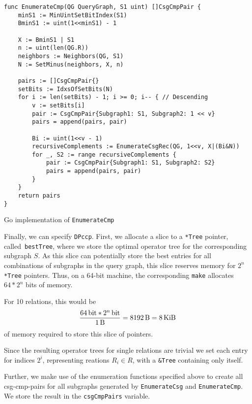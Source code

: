 \begin{algorithm}[H]
\begin{verbatim}
func EnumerateCmp(QG QueryGraph, S1 uint) []CsgCmpPair {
    minS1 := MinUintSetBitIndex(S1)
    BminS1 := uint(1<<minS1) - 1

    X := BminS1 | S1
    n := uint(len(QG.R))
    neighbors := Neighbors(QG, S1)
    N := SetMinus(neighbors, X, n)

    pairs := []CsgCmpPair{}
    setBits := IdxsOfSetBits(N)
    for i := len(setBits) - 1; i >= 0; i-- { // Descending
        v := setBits[i]
        pair := CsgCmpPair{Subgraph1: S1, Subgraph2: 1 << v}
        pairs = append(pairs, pair)

        Bi := uint(1<<v - 1)
        recursiveComplements := EnumerateCsgRec(QG, 1<<v, X|(Bi&N))
        for _, S2 := range recursiveComplements {
            pair := CsgCmpPair{Subgraph1: S1, Subgraph2: S2}
            pairs = append(pairs, pair)
        }
    }
    return pairs
}
\end{verbatim}
\caption{Go implementation of \texttt{EnumerateCmp}}
\label{alg:enumeratecmp}
\end{algorithm}
\newpage

Finally, we can specify \texttt{DPccp}. 
First, we allocate a slice to a \texttt{*Tree} pointer, called \texttt{bestTree}, where we store the optimal operator tree for the corresponding subgraph $S$. As this slice can potentially store the best entries for all combinations of subgraphs in the query graph, this slice reserves memory for $2^n$ \texttt{*Tree} pointers. Thus, on a 64-bit machine, the corresponding \texttt{make} allocates $64 * 2^n$ bits of memory.

\begin{example}
For 10 relations, this would be 
\begin{equation}
\frac{\SI{64}{\bit} * \SI[parse-numbers = false]{2^n}{\bit}}{\SI{1}{\byte}} = \SI{8192}{\byte} = \SI{8}{\kibi\byte}
\end{equation}
of memory required to store this slice of pointers.
\end{example}

Since the resulting operator trees for single relations are trivial we set each entry for indices $2^i$, representing reations $R_i \in R$, with a \texttt{\&Tree} containing only itself. 

Further, we make use of the enumeration functions specified above to create all csg-cmp-pairs for all subgraphs generated by \texttt{EnumerateCsg} and \texttt{EnumerateCmp}. We store the result in the \texttt{csgCmpPairs} variable.

